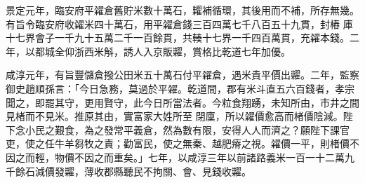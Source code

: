 \begin{pinyinscope}
 景定元年，臨安府平糴倉舊貯米數十萬石，糶補循環，其後用而不補，所存無幾。有旨令臨安府收糴米四十萬石，用平糴倉錢三百四萬七千八百五十九貫，封樁
 庫十七界會子一千九十五萬二千一百餘貫，共輳十七界一千四百萬貫，充糴本錢。二年，以都城全仰浙西米斛，誘人入京販糶，賞格比乾道七年加優。



 咸淳元年，有旨豐儲倉撥公田米五十萬石付平糴倉，遇米貴平價出糶。二年，監察御史趙順孫言：「今日急務，莫過於平糴。乾道間，郡有米斗直五六百錢者，孝宗聞之，即罷其守，更用賢守，此今日所當法者。今粒食翔踴，未知所由，市井之間見楮而不見米。推原其由，實富家大姓所至
 閉廩，所以糴價愈高而楮價陰減。陛下念小民之艱食，為之發常平義倉，然為數有限，安得人人而濟之？願陛下課官吏，使之任牛羊芻牧之責；勸富民，使之無秦、越肥瘠之視。糴價一平，則楮價不因之而輕，物價不因之而重矣。」七年，以咸淳三年以前諸路義米一百一十二萬九千餘石減價發糶，薄收郡縣聽民不拘關、會、見錢收糶。



\end{pinyinscope}